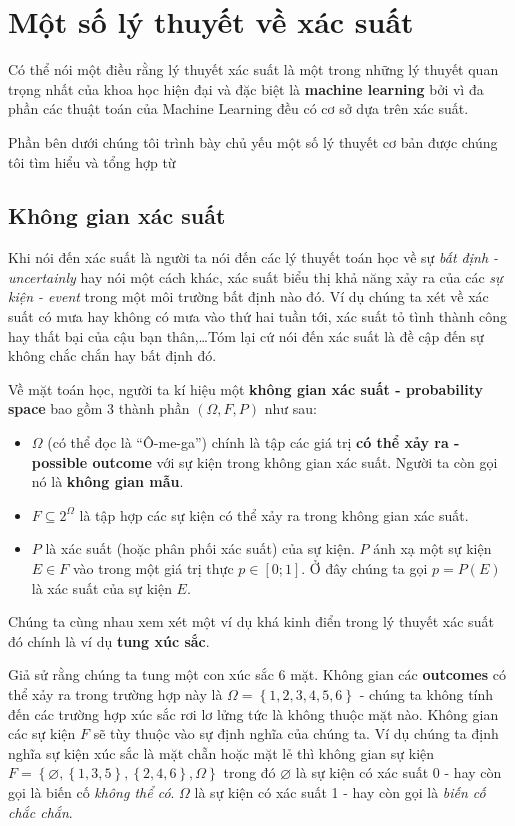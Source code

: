\documentclass[../main-report.tex]{subfiles}
\begin{document}
\section{Một số lý thuyết về xác suất}
Có thể nói một điều rằng lý thuyết xác suất là một trong những lý thuyết quan trọng nhất của khoa học hiện đại và đặc biệt là \textbf{machine learning} bởi vì đa phần các thuật toán của Machine Learning đều có cơ sở dựa trên xác suất.

Phần bên dưới chúng tôi trình bày chủ yếu một số lý thuyết cơ bản được chúng tôi tìm hiểu và tổng hợp từ \citep{MLCB:xacsuat}
\subsection{Không gian xác suất}
Khi nói đến xác suất là người ta nói đến các lý thuyết toán học về sự \textit{bất định - uncertainly} hay nói một cách khác, xác suất biểu thị khả năng xảy ra của các \textit{sự kiện - event} trong một môi trường bất định nào đó. Ví dụ chúng ta xét về xác suất có mưa hay không có mưa vào thứ hai tuần tới, xác suất tỏ tình thành công hay thất bại của cậu bạn thân,\ldots Tóm lại cứ nói đến xác suất là đề cập đến sự không chắc chắn hay bất định đó.

Về mặt toán học, người ta kí hiệu một \textbf{không gian xác suất - probability space} bao gồm 3 thành phần $(\Omega, F, P)$ như sau:

\begin{itemize}
\item $\Omega$ (có thể đọc là ``Ô-me-ga'') chính là tập các giá trị \textbf{có thể xảy ra - possible outcome} với sự kiện trong không gian xác suất. Người ta còn gọi nó là \textbf{không gian mẫu}.
\item $F \subseteq 2^{\Omega}$ là tập hợp các sự kiện có thể xảy ra trong không gian xác suất.
\item $P$ là xác suất (hoặc phân phối xác suất) của sự kiện. $P$ ánh xạ một sự kiện $E \in F$ vào trong một giá trị thực $p \in \left [ 0;1 \right ]$. Ở đây chúng ta gọi $p = P(E)$ là xác suất của sự kiện $E$.
\end{itemize}


Chúng ta cùng nhau xem xét một ví dụ khá kinh điển trong lý thuyết xác suất đó chính là ví dụ \textbf{tung xúc sắc}.

\begin{example} \label{ex:xuc_sac}
Giả sử rằng chúng ta tung một con xúc sắc 6 mặt. Không gian các \textbf{outcomes} có thể xảy ra trong trường hợp này là $\Omega = \left \{ 1, 2, 3, 4, 5, 6 \right \}$ - chúng ta không tính đến các trường hợp xúc sắc rơi lơ lửng tức là không thuộc mặt nào. Không gian các sự kiện $F$ sẽ tùy thuộc vào sự định nghĩa của chúng ta. Ví dụ chúng ta định nghĩa sự kiện xúc sắc là mặt chẵn hoặc mặt lẻ thì không gian sự kiện $F=\left \{ \varnothing , \left \{ 1, 3, 5 \right \}, \left \{ 2, 4, 6 \right \}, \Omega \right \}$ trong đó $\varnothing$ là sự kiện có xác suất 0 - hay còn gọi là biến cố \textit{không thể có}. $\Omega$ là sự kiện có xác suất 1 - hay còn gọi là \textit{biến cố chắc chắn}.
\end{example}
\end{document}
